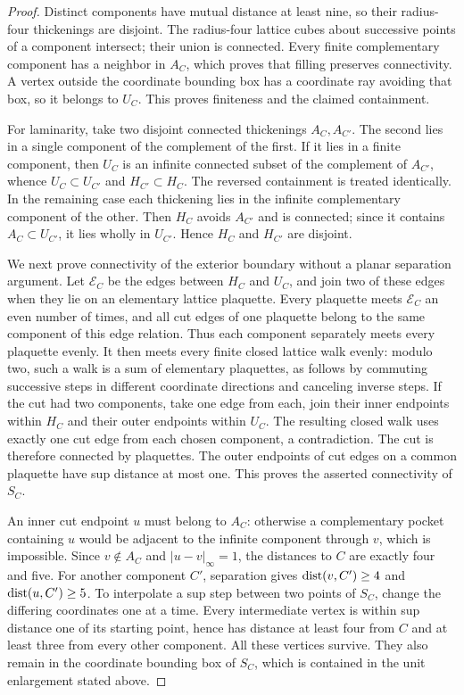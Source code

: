 \begin{proof}
Distinct components have mutual distance at least nine, so their
radius-four thickenings are disjoint.  The radius-four lattice cubes about
successive points of a component intersect; their union is connected.
Every finite complementary component has a neighbor in $A_C$, which proves
that filling preserves connectivity.  A vertex outside the coordinate
bounding box has a coordinate ray avoiding that box, so it belongs to
$U_C$.  This proves finiteness and the claimed containment.

For laminarity, take two disjoint connected thickenings $A_C,A_{C'}$.
The second lies in a single component of the complement of the first.
If it lies in a finite component, then $U_C$ is an infinite connected
subset of the complement of $A_{C'}$, whence $U_C\subset U_{C'}$ and
$H_{C'}\subset H_C$.  The reversed containment is treated identically.
In the remaining case each thickening lies in the infinite complementary
component of the other.  Then $H_C$ avoids $A_{C'}$ and is connected;
since it contains $A_C\subset U_{C'}$, it lies wholly in $U_{C'}$.
Hence $H_C$ and $H_{C'}$ are disjoint.

We next prove connectivity of the exterior boundary without a planar
separation argument.  Let $\mathcal E_C$ be the edges between $H_C$ and
$U_C$, and join two of these edges when they lie on an elementary lattice
plaquette.  Every plaquette meets $\mathcal E_C$ an even number of times,
and all cut edges of one plaquette belong to the same component of this
edge relation.  Thus each component separately meets every plaquette
evenly.  It then meets every finite closed lattice walk evenly: modulo two,
such a walk is a sum of elementary plaquettes, as follows by commuting
successive steps in different coordinate directions and canceling inverse
steps.  If the cut had two components, take one edge from each, join their
inner endpoints within $H_C$ and their outer endpoints within $U_C$.
The resulting closed walk uses exactly one cut edge from each chosen
component, a contradiction.  The cut is therefore connected by plaquettes.
The outer endpoints of cut edges on a common plaquette have sup distance
at most one.  This proves the asserted connectivity of $S_C$.

An inner cut endpoint $u$ must belong to $A_C$: otherwise a complementary
pocket containing $u$ would be adjacent to the infinite component through
$v$, which is impossible.  Since $v\notin A_C$ and $|u-v|_\infty=1$,
the distances to $C$ are exactly four and five.  For another component
$C'$, separation gives $\operatorname{dist}(v,C')\ge4$ and $\operatorname{dist}(u,C')\ge5$.
To interpolate a sup step between two points of $S_C$, change the differing
coordinates one at a time.  Every intermediate vertex is within sup
distance one of its starting point, hence has distance at least four
from $C$ and at least three from every other component.  All these
vertices survive.  They also remain in the coordinate bounding box of
$S_C$, which is contained in the unit enlargement stated above.
\end{proof}

